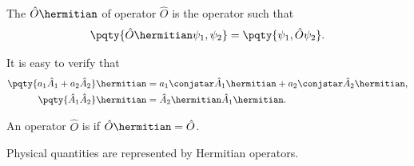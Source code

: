 \begin{definition}
    The  \(\hat{O}\hermitian\) of operator \(\hat{O}\) is the operator such that
    \begin{equation}
        \pqty{\hat{O}\hermitian \psi_1, \psi_2} = \pqty{\psi_1, \hat{O} \psi_2}.
    \end{equation}
\end{definition}

It is easy to verify that
\begin{subequations}
    \begin{align}
        \pqty{a_1 \hat{A}_1 + a_2 \hat{A}_2}\hermitian &= a_1\conjstar \hat{A}_1\hermitian + a_2\conjstar \hat{A}_2\hermitian, \\
        \pqty{\hat{A}_1 \hat{A}_2}\hermitian &= \hat{A}_2\hermitian \hat{A}_1\hermitian.
    \end{align}
\end{subequations}

\begin{definition}
    An operator \(\hat{O}\) is  if \(\hat{O}\hermitian = \hat{O}\).
\end{definition}

\begin{remark}
    Physical quantities are represented by Hermitian operators.
\end{remark}

